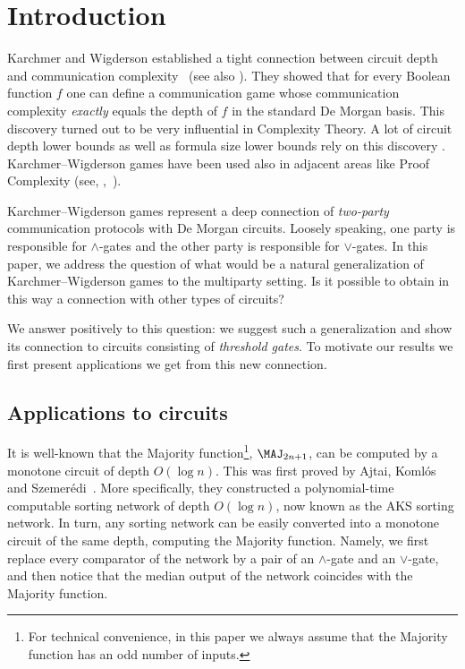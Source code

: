 
%
%
%

%

 \section{Introduction} \label{sec:intro}


Karchmer and Wigderson established a tight connection between circuit depth
and communication complexity~\cite{KW90} (see also \cite[Chapter 9]{rao_yehudayoff_2020}).  %
They  %
showed that for every Boolean function $f$ one can define a communication game whose communication complexity \emph{exactly} equals the depth of $f$ in the standard De Morgan basis. This discovery turned out to be very influential in Complexity Theory. A lot of circuit depth lower bounds as well as formula size lower bounds rely on this discovery \cite{KRW95, RM97, GMWW2014, GP2014, DM2018}. Karchmer--Wigderson games have been used also in adjacent areas like Proof Complexity (see, \eg,~\cite{Sok2017}).

Karchmer--Wigderson games represent a deep connection of \emph{two-party} communication protocols with De Morgan circuits. Loosely speaking, one party is responsible for $\land$-gates and the other party is responsible for $\lor$-gates. In this paper, we address the question of what would be a natural generalization of Karchmer--Wigderson games to the multiparty setting. Is it possible to obtain in this way a connection with other types of circuits?

We answer positively to this question: we suggest such a generalization and show its connection to circuits consisting of \emph{threshold gates}. To motivate our results we first present applications we get from this new connection.

\subsection{Applications to circuits}

It is well-known that the Majority function\footnote{For technical convenience, in this paper we always assume that the Majority function has an odd number of inputs.},  $\MAJ_{2n + 1}$, can be computed by 
%
a monotone circuit of depth $O(\log n)$.  %
This was first proved by Ajtai, Koml\'{o}s and Szemer\'{e}di~\cite{AKS83}. More specifically, they constructed a polynomial-time computable 
%
sorting network of depth $O(\log n)$, %
now known as the AKS sorting network. In turn, any sorting network can be easily converted into a monotone circuit of the same depth, computing the Majority function. Namely, we first replace every comparator of the network by a pair of an $\land$-gate and an $\lor$-gate, and then notice that the median output of the network coincides with the Majority function.


